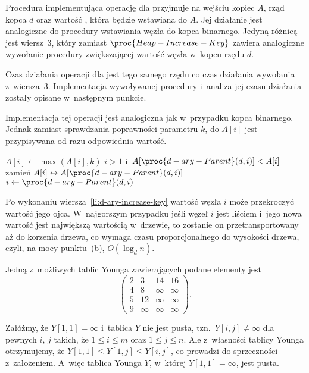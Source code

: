 \subproblem %
Procedura  implementująca operację  dla  przyjmuje na wejściu kopiec $A$, rząd kopca $d$ oraz wartość , która będzie wstawiana do $A$. Jej działanie jest analogiczne do procedury wstawiania węzła do kopca binarnego. Jedyną różnicą jest wiersz~3, który zamiast $\proc{Heap-Increase-Key}$ zawiera analogiczne wywołanie procedury  zwiększającej wartość węzła w~kopcu rzędu $d$.

Czas działania operacji  dla  jest tego samego rzędu co czas działania wywołania z~wiersza~3. Implementacja wywoływanej procedury  i~analiza jej czasu działania zostały opisane w~następnym punkcie.

\subproblem %
Implementacja tej operacji jest analogiczna jak w~przypadku kopca binarnego. Jednak zamiast sprawdzania poprawności parametru $k$, do $A[i]$ jest przypisywana od razu odpowiednia wartość.
\begin{codebox}
\li	$A[i]\gets\max(A[i],k)$ \label{li:d-ary-increase-key}
\li	\While $i>1$ i~$A[\proc{d-ary-Parent}(d,i)]<A[i]$
\li		\Do
			zamień $A[i]\leftrightarrow A[\proc{d-ary-Parent}(d,i)]$
\li			$i\gets\proc{d-ary-Parent}(d,i)$
		\End
\end{codebox}

Po wykonaniu wiersza~\ref{li:d-ary-increase-key} wartość węzła $i$ może przekroczyć wartość jego ojca. W~najgorszym przypadku jeśli węzeł $i$ jest liściem i~jego nowa wartość jest największą wartością w~drzewie, to zostanie on przetransportowany aż do korzenia drzewa, co wymaga czasu proporcjonalnego do wysokości drzewa, czyli, na mocy punktu~(b), $O(\log_dn)$.


\subproblem %
Jedną z~możliwych tablic Younga zawierających podane elementy jest
\[
	\begin{pmatrix}
		2 & 3 & 14 & 16 \\
		4 & 8 & \infty & \infty \\
		5 & 12 & \infty & \infty \\
		9 & \infty& \infty & \infty
	\end{pmatrix}.
\]

\subproblem %
Załóżmy, że $Y[1,1]=\infty$ i~tablica $Y$ nie jest pusta, tzn.\ $Y[i,j]\ne\infty$ dla pewnych $i$, $j$ takich, że $1\le i\le m$ oraz $1\le j\le n$. Ale z~własności tablicy Younga otrzymujemy, że $Y[1,1]\le Y[1,j]\le Y[i,j]$, co prowadzi do sprzeczności z~założeniem. A~więc tablica Younga $Y$, w~której $Y[1,1]=\infty$, jest pusta.

